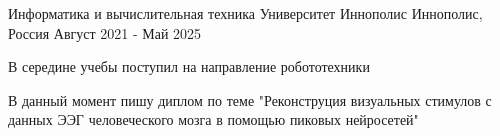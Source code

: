 

\begin{cventries}

  \cventry
    {Информатика и вычислительная техника} %
    {Университет Иннополис} %
    {Иннополис, Россия} %
    {Август 2021 - Май 2025} %
    {
      \begin{cvitems} %
        \item {В середине учебы поступил на направление робототехники}
        \item {В данный момент пишу диплом по теме "Реконструция визуальных стимулов с данных ЭЭГ человеческого мозга в помощью пиковых нейросетей"}
      \end{cvitems}
    }

\end{cventries}
